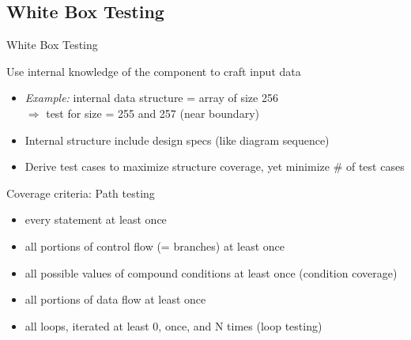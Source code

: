 \subsection{White Box Testing}
\begin{frame}{White Box Testing}

  \begin{block}{Use internal knowledge of the component to craft input data}
    \begin{itemize}
    \item \textit{Example:} internal data structure = array of size 256\\
      $\Rightarrow$ test for size = 255 and 257 (near boundary) 
    \item Internal structure include design specs (like diagram sequence)
    \item Derive test cases to maximize structure coverage, yet minimize \# of
      test cases

    \end{itemize}
  \end{block}

  \begin{block}{Coverage criteria: Path testing}
    \begin{itemize}
    \item every statement at least once
    \item all portions of control flow (= branches) at least once
    \item all possible values of compound conditions at least once (condition
      coverage)\\
    \item all portions of data flow at least once
    \item all loops, iterated at least 0, once, and N times (loop testing)
    \end{itemize}
  \end{block}

\end{frame}
